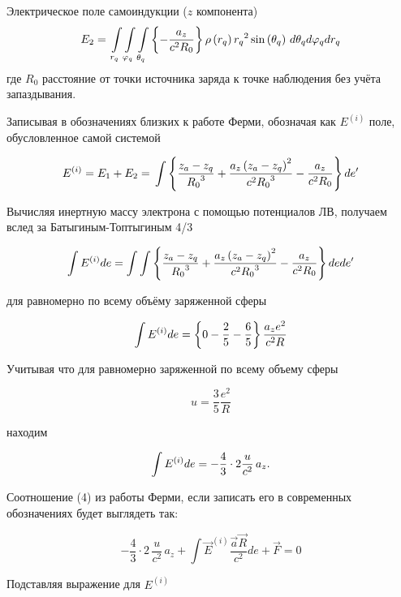 \documentclass[12pt]{article}
\begin{document}
Электрическое поле самоиндукции ($z$ компонента)
\[{E}_{2}=\\
\int\limits_{{{r}_{q}}}\int\limits_{{{\varphi}_{q}}}\int\limits_{{{\theta}_{q}}}\\
{\left\{ -\frac{{a_z}}{{{c}^{2}}{{{R}_{0}}}} \right\}\\
{\rho \left( {{r}_{q}} \right){{r}_{q}}^{2}\sin \left( {{\theta }_{q}} \right)}\ }d{{\theta }_{q}}d{{\varphi }_{q}}d{{r}_{q}}\]
где ${R}_{0}$ расстояние от точки источника заряда к точке наблюдения без учёта запаздывания.

Записывая в обозначениях близких к работе Ферми, обозначая как ${E}^{(i)}$ поле, обусловленное самой системой

\[{E}^{(i)}={E}_{1}+{E}_{2}=\\
\int\left\{ \frac{z_a-z_q}{{{R}_{0}}^3}+\frac{a_z\left( {{z}_{a}}-{{z}_{q}} \right)^2}{c^2{{{R}_{0}}^3}} - \frac{{a_z}}{{{c}^{2}}{{{R}_{0}}}}\\
\right\}\\de'\]

Вычисляя инертную массу электрона с помощью потенциалов ЛВ, получаем вслед за Батыгиным-Топтыгиным 4/3


\[\int {E}^{(i)} de = \int\int \left\{ \frac{z_a-z_q}{{{R}_{0}}^3}+\frac{a_z\left( {{z}_{a}}-{{z}_{q}} \right)^2}{c^2{{{R}_{0}}^3}}  -\frac{{a_z}}{{{c}^{2}}{{{R}_{0}}}}
 \right\}\\
de de'\]

для равномерно по всему объёму заряженной сферы

\[\int {E}^{(i)} de = \left\{ 0 - \frac{2}{5}  - \frac{6}{5} \right\}\frac{a_z e^2}{ c^2{{{R}}}}\\
\]	

Учитывая что для равномерно заряженной по всему объему сферы

\[u = \frac{3}{5}\frac{e^2}{R}\]

находим

\[\int {E}^{(i)} de = -\frac{4}{3} \cdot 2\frac{u}{c^2}\,a_z.\\
\]	

 Соотношение (4) из работы Ферми, если записать его в современных обозначениях будет выглядеть так:

$$-\frac{4}{3}\cdot 2 \,\frac{u}{c^2} \, a_z + \int \vec E^{(i)}\frac{\vec a \vec R}{c^2} de + \vec F = 0$$

Подставляя выражение для ${E}^{(i)}$
\end{document}

